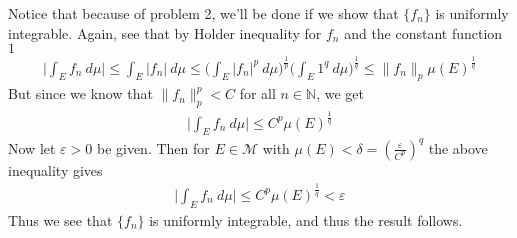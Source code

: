 \documentclass[12pt]{exam}
\theoremstyle{plain} %
\theoremstyle{definition} %
\theoremstyle{remark} %
\begin{document}
\begin{questions}
  \question
  \begin{solution}
    Notice that because of problem 2, we'll be done if we show that
    $\{ f_n \}$ is
    uniformly integrable. Again, see that by Holder inequality for
    $f_n$ and the constant function $1$
    \begin{align*}
      \Bigg| \int_E f_n \ d \mu \Bigg| \le \int_E |f_n| \ d \mu \le
      \Big( \int_E |f_n|^p \ d \mu\Big)^{\frac{1}{p}} \Big( \int_E 1^q
      \ d \mu\Big)^{\frac{1}{q}} \le \|f_n\|_p \mu(E)^{\frac{1}{q}}
    \end{align*}
    But since we know that $\|f_{n}\|_p^p < C$ for all $n \in
    \mathbb{N}$, we get
    \begin{align*}
      \Bigg| \int_E f_n \ d \mu \Bigg| \le C^p \mu(E)^{\frac{1}{q}}
    \end{align*}
    Now let $\varepsilon > 0$ be given. Then for $E \in \mathcal{M}$ with
    $\mu(E) < \delta = (\frac{\varepsilon}{C^p})^q$ the above inequality gives
    \begin{align*}
      \Bigg| \int_E f_n \ d \mu \Bigg| \le C^p \mu(E)^{\frac{1}{q}} <
      \varepsilon
    \end{align*}
    Thus we see that $\{ f_n \}$ is uniformly integrable, and thus
    the result follows.
  \end{solution}

\end{questions}
\printbibliography[heading=bibintoc]
\end{document}
